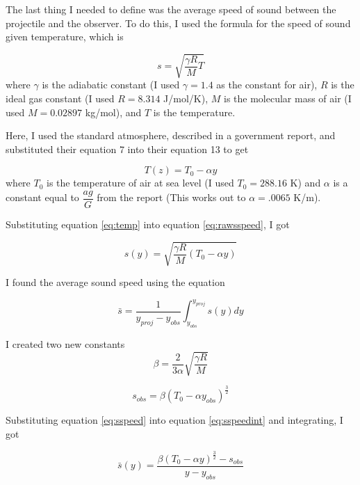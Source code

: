 \documentclass[%
 reprint,
 amsmath,amssymb,
 aps,
]{revtex4-1}
\begin{document}
The last thing I needed to define was the average speed of sound between the projectile and the observer. To do this, I used the formula for the speed of sound given temperature, which is 

\begin{equation}\label{eq:rawsspeed}
s = \sqrt{\dfrac{\gamma R}{M} T}
\end{equation}
where $\gamma$ is the adiabatic constant (I used $\gamma = 1.4$ as the constant for air), $R$ is the ideal gas constant (I used $R = 8.314$ J/mol/K), $M$ is the molecular mass of air (I used $M = 0.02897$ kg/mol), and $T$ is the temperature.

Here, I used the standard atmosphere, described in a government report\cite{atmos}, and substituted their equation 7 into their equation 13 to get

\begin{equation}\label{eq:temp}
T(z) = T_0 - \alpha y
\end{equation}
where $T_0$ is the temperature of air at sea level (I used $T_0 = 288.16$ K) and $\alpha$ is a constant equal to $\dfrac{ag}{G}$ from the report\cite{atmos} (This works out to $\alpha = .0065$ K/m).

Substituting equation \ref{eq:temp} into equation \ref{eq:rawsspeed}, I got

\begin{equation}\label{eq:sspeed}
s(y) = \sqrt{\dfrac{\gamma R}{M} (T_0 - \alpha y)}
\end{equation}

I found the average sound speed using the equation

\begin{equation}\label{eq:sspeedint}
\bar{s}  = \dfrac{1}{y_{proj} - y_{obs}}\int^{y_{proj}}_{y_{obs}} s(y) dy
\end{equation}

I created two new constants
\begin{equation}\label{eq:beta}
\beta = \dfrac{2}{3 \alpha}\sqrt{\dfrac{\gamma R}{M}}
\end{equation}

\begin{equation}\label{eq:epsilon}
s_{obs} = \beta (T_0 - \alpha y_{obs})^{\frac{3}{2}}
\end{equation}

Substituting equation \ref{eq:sspeed} into equation \ref{eq:sspeedint} and integrating, I got

\begin{equation}\label{eq:sspeedav}
\bar{s}(y) = \dfrac{\beta(T_0 - \alpha y)^{\frac{3}{2}}-s_{obs}}{y-y_{obs}}
\end{equation}
\end{document}
